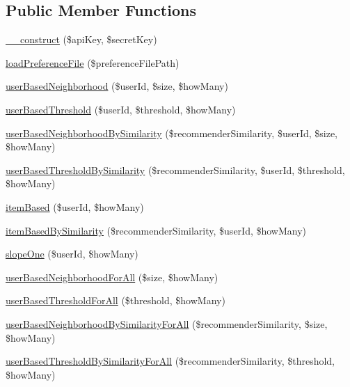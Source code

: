 \subsection*{Public Member Functions}
\begin{DoxyCompactItemize}
\item 
\hyperlink{class_recommender_service_a49f2ad222e06420736d750e167d55d7c}{\+\_\+\+\_\+construct} (\$api\+Key, \$secret\+Key)
\item 
\hyperlink{class_recommender_service_aa9fa1e0f1c13a62e700758ee712ab7f3}{load\+Preference\+File} (\$preference\+File\+Path)
\item 
\hyperlink{class_recommender_service_a6b0a05622d648137b98a8420a8b8f962}{user\+Based\+Neighborhood} (\$user\+Id, \$size, \$how\+Many)
\item 
\hyperlink{class_recommender_service_a6fbd17dd1bee9eae210329dc86062056}{user\+Based\+Threshold} (\$user\+Id, \$threshold, \$how\+Many)
\item 
\hyperlink{class_recommender_service_ad9c20c85436efd7e59e043e9256ce674}{user\+Based\+Neighborhood\+By\+Similarity} (\$recommender\+Similarity, \$user\+Id, \$size, \$how\+Many)
\item 
\hyperlink{class_recommender_service_a60c5c1f7dee5838b4a060c195a7163a2}{user\+Based\+Threshold\+By\+Similarity} (\$recommender\+Similarity, \$user\+Id, \$threshold, \$how\+Many)
\item 
\hyperlink{class_recommender_service_ae7c3a8fce710cd368b3bee89d3d483b4}{item\+Based} (\$user\+Id, \$how\+Many)
\item 
\hyperlink{class_recommender_service_ac7f301e7f8dbf82191df1841a7f681e5}{item\+Based\+By\+Similarity} (\$recommender\+Similarity, \$user\+Id, \$how\+Many)
\item 
\hyperlink{class_recommender_service_a9a7cb768977b4b9e4bb53a70fb389565}{slope\+One} (\$user\+Id, \$how\+Many)
\item 
\hyperlink{class_recommender_service_a7c79fa393b4db3b2c889c9e00ebca448}{user\+Based\+Neighborhood\+For\+All} (\$size, \$how\+Many)
\item 
\hyperlink{class_recommender_service_a4bee5e97f1e2f9e103382434a80a054b}{user\+Based\+Threshold\+For\+All} (\$threshold, \$how\+Many)
\item 
\hyperlink{class_recommender_service_a3cce15d649d791df400747420fbea104}{user\+Based\+Neighborhood\+By\+Similarity\+For\+All} (\$recommender\+Similarity, \$size, \$how\+Many)
\item 
\hyperlink{class_recommender_service_a48380cad6fdaa903b6cca5851a9a7773}{user\+Based\+Threshold\+By\+Similarity\+For\+All} (\$recommender\+Similarity, \$threshold, \$how\+Many)

\end{DoxyCompactItemize}
